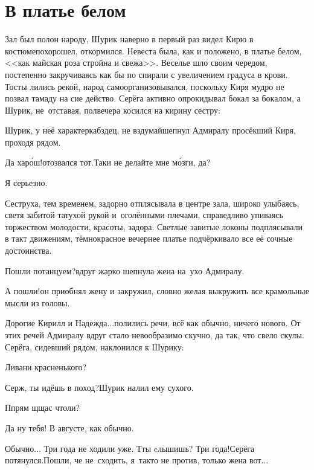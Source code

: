 {
\chapter{В платье белом}
\vepsianrose

\fancyhead[LE]{\fancyplain{}{\bfseries \parttitle}}
\fancyhead[RO]{\fancyplain{}{\bfseries \rightmark}}

Зал был полон народу, Шурик наверно в первый раз видел Кирю в костюме\mdash похорошел, откормился. Невеста была, как и положено, в платье белом, <<как майская роза стройна и свежа>>. Веселье шло своим чередом, постепенно закручиваясь как бы по спирали с увеличением градуса в крови. Тосты лились рекой, народ самоорганизовывался, поскольку Киря мудро не позвал тамаду на сие действо. Серёга активно опрокидывал бокал за бокалом, а Шурик, не~отставая, полвечера косился на кирину сестру:

\diagdash Шурик, у неё характер\mdash кабздец, не вздумай\mdash шепнул Адмиралу просёкший Киря, проходя рядом. 

\diagdash Да хар\'{о}ш!\mdash отозвался тот.\mdash Таки не делайте мне м\'{о}зги, да?

\diagdash Я серьезно.

Сеструха, тем временем, задорно отплясывала в центре зала, широко улыбаясь, светя забитой татухой рукой и~оголёнными плечами, справедливо упиваясь торжеством молодости, красоты, задора. Светлые завитые локоны подплясывали в такт движениям, тёмно\sdash красное вечернее платье подчёркивало все её сочные достоинства.

\diagdash Пошли потанцуем?\mdash вдруг жарко шепнула жена на~ухо Адмиралу.

\diagdash А пошли!\mdash он приобнял жену и закружил, словно желая выкружить все крамольные мысли из головы. 

\diagdash Дорогие Кирилл и Надежда$\ldots$\mdash полились речи, всё как обычно, ничего нового. От этих речей Адмиралу вдруг стало невообразимо скучно, да так, что свело скулы. Серёга, сидевший рядом, наклонился к Шурику:

\diagdash Ливани красненького?

\diagdash Серж, ты идёшь в поход?\mdash Шурик налил ему сухого. 

\diagdash П\sdash прям щ\sdash щас чтоли?

\diagdash Да ну тебя! В августе, как обычно.

\diagdash Обычно$\ldots$ Три года не ходили уже. Т\sdash ты cлышишь? Три года!\mdash Серёга потянулся.\mdash Пошли, че не~сходить, я~так\sdash то не против, только жена вот$\ldots$

}
